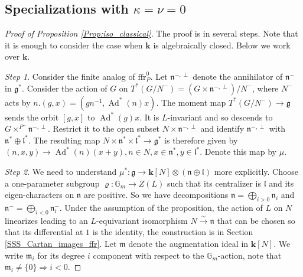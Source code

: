 \documentclass{amsart}
\theoremstyle{definition}
\newcommand{\g}{\mathfrak{g}}
\newcommand{\h}{\mathfrak{h}}
\newcommand{\ffr}{\mathrm{ffr}}
\newcommand{\lf}{\mathfrak{l}}
\newcommand{\bk}{\mathbf{k}}
\newcommand{\sx}{\mathsf{x}}
\numberwithin{equation}{section}
\begin{document}
\subsection{Specializations with $\kappa=\nu=0$}\label{SS_classical_specialization}
\begin{proof}[Proof of Proposition \ref{Prop:iso_classical}]
The proof is in several steps. Note that it is enough to consider the case when $\bk$ is algebraically closed. Below we work over $\bk$. 


{\it Step 1}. 
Consider the finite analog of $\ffr_P^0$.
Let $\mathfrak{n}^{-,\perp}$ denote the annihilator of $\mathfrak{n}^-$ in $\mathfrak{g}^*$. 
Consider the action of $G$ on $T^*(G/N^-)=(G\times \mathfrak{n}^{-,\perp})/N^-$, where 
$N^-$ acts by $n.(g,x)=(gn^{-1}, \operatorname{Ad}^*(n)x)$. The moment map
$T^*(G/N^-)\rightarrow \g$ sends the orbit $[g,x]$ to $\operatorname{Ad}^*(g)x$. It is $L$-invariant and so descends to $G\times^{P^-}\mathfrak{n}^{-,\perp}$. Restrict it to the open subset $N\times \mathfrak{n}^{-,\perp}$ and identify $\mathfrak{n}^{-,\perp}$ with 
$\mathfrak{n}^*\oplus \mathfrak{l}^*$. The resulting map 
$N\times \mathfrak{n}^*\times \mathfrak{l}^*\rightarrow \g^*$ is therefore given by $(n,x,y)\rightarrow \operatorname{Ad}^*(n)(x+y), n\in N, x\in \mathfrak{n}^*, y\in \mathfrak{l}^*$.  Denote this map by $\mu$. 

{\it Step 2}. We need to understand $\mu^*:\g\rightarrow \bk[N]\otimes (\mathfrak{n}\oplus \mathfrak{l})$ more explicitly. 
Choose a one-parameter subgroup $\varrho:\mathbb{G}_m\rightarrow Z(L)$ such that its centralizer is $\lf$ and its eigen-characters on $\mathfrak{n}$ are positive. So we have decompositions
$\mathfrak{n}=\bigoplus_{i>0}\mathfrak{n}_i$ and $\mathfrak{n}^-=\bigoplus_{i<0}\mathfrak{n}^-_i$. Under the assumption of the proposition, the action of $L$ on $N$ linearizes leading to an $L$-equivariant isomorphism $N\xrightarrow{\sim} \mathfrak{n}$ that can be chosen so that its differential at $1$ is the identity, the construction is in Section \ref{SSS_Cartan_images_ffr}. Let $\mathfrak{m}$ denote the augmentation ideal in $\bk[N]$. We write $\mathfrak{m}_i$ for its degree $i$ component with respect to the $\mathbb{G}_m$-action, note that $\mathfrak{m}_i\neq \{0\}\Rightarrow i<0$.


\end{proof}
\end{document}
